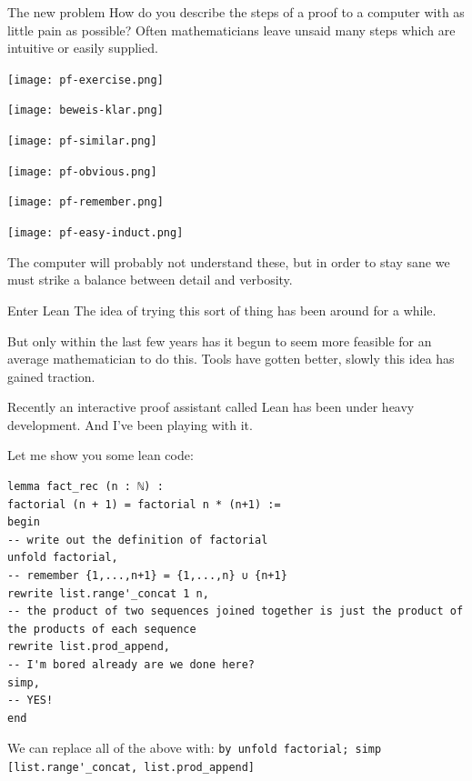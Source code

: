 \documentclass{beamer}
\theoremstyle{plain}
\begin{document}
{\begin{frame}{The new problem}
    How do you describe the steps of a proof to a computer with as little pain as possible? \pause
    Often mathematicians leave unsaid many steps which are intuitive or easily supplied. \pause

    \texttt{[image: pf-exercise.png]}\pause

    \texttt{[image: beweis-klar.png]}\pause

    \texttt{[image: pf-similar.png]}\pause

    \texttt{[image: pf-obvious.png]}\pause

    \texttt{[image: pf-remember.png]}\pause

    \texttt{[image: pf-easy-induct.png]}\pause

    The computer will probably not understand these, but in order to stay sane we must strike a balance between detail and verbosity.
\end{frame}

\begin{frame}{Enter Lean}
    The idea of trying this sort of thing has been around for a while. \pause

    But only within the last few years has it begun to seem more feasible for an average mathematician to do this. Tools have gotten better, slowly this idea has gained traction.\pause

    Recently an interactive proof assistant called Lean has been under heavy development. And I've been playing with it.

    Let me show you some lean code:
\end{frame}

\begin{frame}[fragile]
\begin{lstlisting}
lemma fact_rec (n : ℕ) :
factorial (n + 1) = factorial n * (n+1) :=
begin
-- write out the definition of factorial
unfold factorial,
-- remember {1,...,n+1} = {1,...,n} ∪ {n+1}
rewrite list.range'_concat 1 n,
-- the product of two sequences joined together is just the product of the products of each sequence
rewrite list.prod_append,
-- I'm bored already are we done here?
simp,
-- YES!
end
\end{lstlisting}\pause
We can replace all of the above with: \lstinline{by unfold factorial; simp [list.range'_concat, list.prod_append]}


\end{frame}}
\end{document}
